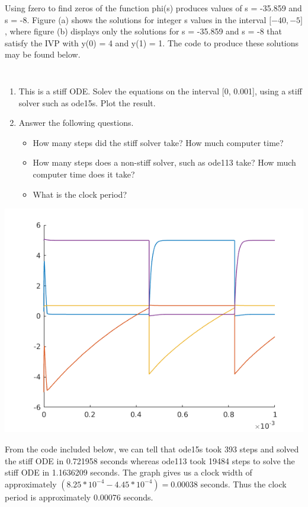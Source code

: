 \documentclass{jhwhw}
\begin{document}
    Using fzero to find zeros of the function phi(s) produces 
    values of s = -35.859 and s = -8.
    Figure (a) shows the solutions for integer s values in the interval
    $\lbrack -40, -5\rbrack$, where figure (b) displays only the solutions
    for s = -35.859 and s = -8 that satisfy the IVP with y(0) = 4 and y(1) = 1.
    The code to produce these solutions may be found below.

    \clearpage
    \inputminted[linenos,frame=lines,framesep=2mm]{octave}{p4.m}
    \inputminted[linenos,frame=lines,framesep=2mm]{octave}{phi.m}

\problem{}

    \begin{enumerate}
	\item This is a stiff ODE. Solev the equations on the interval [0, 0.001],
	    using a stiff solver such as ode15s. Plot the result.
	\item Answer the following questions.
	    \begin{itemize}
		\item How many steps did the stiff solver take? How much computer time?
		\item How many steps does a non-stiff solver, such as ode113 take? How
		    much computer time does it take?
		\item What is the clock period?
	    \end{itemize}
    \end{enumerate}

\solution

    \begin{center}
	\includegraphics[scale=1.0]{p5a}
    \end{center}

    From the code included below, we can tell that ode15s took 393 steps and 
    solved the stiff ODE in 0.721958 seconds whereas ode113 took 19484 steps to solve the stiff ODE in 1.1636209 seconds.
    The graph gives us a clock width of approximately
    $(8.25 * 10^{-4} - 4.45 * 10^{-4}) = 0.00038$ seconds.
    Thus the clock period is approximately 0.00076 seconds.

    \clearpage
    \inputminted[linenos,frame=lines,framesep=2mm]{octave}{p5.m}
\end{document}
